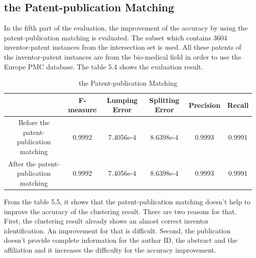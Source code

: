 \subsection{the Patent-publication Matching}
In the fifth part of the evaluation, the improvement of the accuracy by using the patent-publication matching is evaluated. The subset which contains 3604 inventor-patent instances from the intersection set is used. All these patents of the inventor-patent instances are from the bio-medical field in order to use the Europe PMC database.  The table 5.4 shows the evaluation result. \newline
\begin{table} 
\scriptsize
\begin{tabular}{|c|c|c|c|c|c|}
\hline
&F-measure&Lumping Error&Splitting Error&Precision&Recall\\
\hline
Before the patent-publication matching&0.9992&7.4056e-4&8.6398e-4&0.9993 &0.9991\\
\hline
After the patent-publication matching&0.9992&7.4056e-4&8.6398e-4&0.9993 &0.9991 \\
\hline
\end{tabular}
\caption{the Patent-publication Matching}
\end{table}

From the table 5.5, it shows that the patent-publication matching doesn't help to improve the accuracy of the clustering result. There are two reasons for that. First, the clustering result already shows an almost correct inventor identification. An improvement for that is difficult. Second, the publication doesn't provide complete information for the author ID, the abstract and the affiliation and it increases the difficulty for the accuracy improvement.
\newpage
\thispagestyle{empty}
\rule{0cm}{5cm}